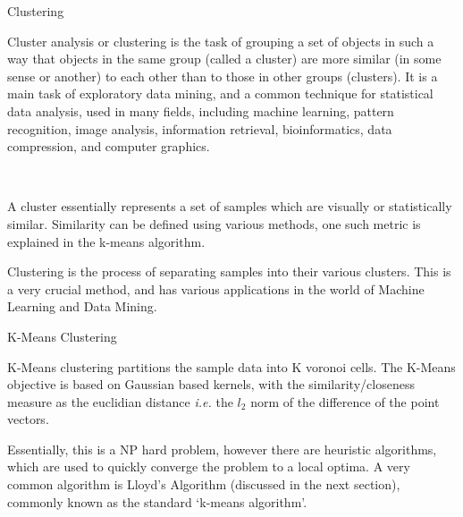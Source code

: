 \documentclass{article}
\begin{document}
\makeheader%

\begin{ssection}{Clustering}
    
    \begin{sdefinition}
        Cluster analysis or clustering is the task of grouping a set of objects in such a way that objects in the same group (called a cluster) are more similar (in some sense or another) to each other than to those in other groups (clusters). It is a main task of exploratory data mining, and a common technique for statistical data analysis, used in many fields, including machine learning, pattern recognition, image analysis, information retrieval, bioinformatics, data compression, and computer graphics.
    \end{sdefinition}~\cite{wiki-cluster} \br%

    A cluster essentially represents a set of samples which are visually or statistically similar. Similarity can be defined using various methods, one such metric is explained in the k-means algorithm. \br%

    Clustering is the process of separating samples into their various clusters. This is a very crucial method, and has various applications in the world of Machine Learning and Data Mining.

\end{ssection}

\begin{ssection}{K-Means Clustering}

    K-Means clustering partitions the sample data into K voronoi cells. The K-Means objective is based on Gaussian based kernels, with the similarity/closeness measure as the euclidian distance \textit{i.e.} the $l_2$ norm of the difference of the point vectors. \br%

    Essentially, this is a NP hard problem, however there are heuristic algorithms, which are used to quickly converge the problem to a local optima. A very common algorithm is Lloyd's Algorithm (discussed in the next section), commonly known as the standard `k-means algorithm'. \br%

\end{ssection}
\end{document}
